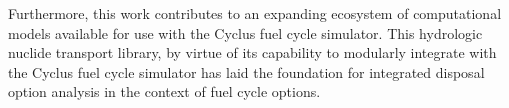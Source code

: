 \documentclass{anstrans}
\begin{document}
Furthermore, this work contributes to an expanding ecosystem of computational 
models available for use with the Cyclus fuel cycle simulator. This hydrologic 
nuclide transport library, by virtue of its capability to modularly integrate 
with the Cyclus fuel cycle simulator has laid the foundation for integrated 
disposal option analysis in the context of fuel cycle options. 





\end{document}
